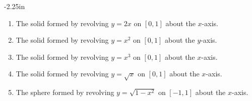 \begin{adjustwidth*}{}{-2.25in}
\begin{multicols*}{2}
\columnbreak


\begin{enumerate}[1),resume]
\item The solid formed by revolving $y=2x$ on $[0,1]$ about the $x$-axis.
\item The solid formed by revolving $y=x^2$ on $[0,1]$ about the $y$-axis.
\item The solid formed by revolving $y=x^3$ on $[0,1]$ about the $x$-axis.
\item The solid formed by revolving $y=\sqrt{x}$ on $[0,1]$ about the $x$-axis.
\item The sphere formed by revolving $y=\sqrt{1-x^2}$ on $[-1,1]$ about the $x$-axis.
\end{enumerate}

\end{multicols*}
\end{adjustwidth*}

%
%
%
%

\afterexercises